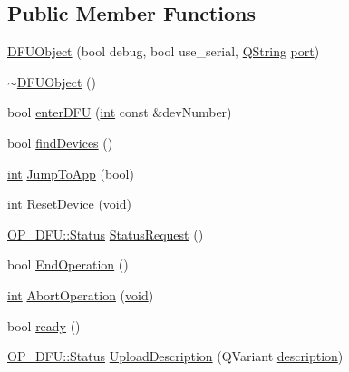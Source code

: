 \subsection*{Public Member Functions}
\begin{DoxyCompactItemize}
\item 
\hyperlink{group___uploader_gacb8ee3e1b1358ae25813e37f08b6d510}{D\-F\-U\-Object} (bool debug, bool use\-\_\-serial, \hyperlink{group___u_a_v_objects_plugin_gab9d252f49c333c94a72f97ce3105a32d}{Q\-String} \hyperlink{classport}{port})
\item 
\hyperlink{group___uploader_gad3eb7cce298c72c456a84eb04cc9c0fe}{$\sim$\-D\-F\-U\-Object} ()
\item 
bool \hyperlink{group___uploader_ga64ed24565b35c4530dd2614cc98f38cd}{enter\-D\-F\-U} (\hyperlink{ioapi_8h_a787fa3cf048117ba7123753c1e74fcd6}{int} const \&dev\-Number)
\item 
bool \hyperlink{group___uploader_ga09f55b9de769e32ad728223294a8a500}{find\-Devices} ()
\item 
\hyperlink{ioapi_8h_a787fa3cf048117ba7123753c1e74fcd6}{int} \hyperlink{group___uploader_gad6165621f503c5767306199a8606edaf}{Jump\-To\-App} (bool)
\item 
\hyperlink{ioapi_8h_a787fa3cf048117ba7123753c1e74fcd6}{int} \hyperlink{group___uploader_gafbdc3dede843764690ebd5bc074ff5dd}{Reset\-Device} (\hyperlink{group___u_a_v_objects_plugin_ga444cf2ff3f0ecbe028adce838d373f5c}{void})
\item 
\hyperlink{class_o_p___d_f_u_a83b075feaf572fe76e597acea58c8eda}{O\-P\-\_\-\-D\-F\-U\-::\-Status} \hyperlink{group___uploader_gadd798371bcb5c155ef215f5a77316471}{Status\-Request} ()
\item 
bool \hyperlink{group___uploader_ga16f60a8d921f01aca803178398ccdf45}{End\-Operation} ()
\item 
\hyperlink{ioapi_8h_a787fa3cf048117ba7123753c1e74fcd6}{int} \hyperlink{group___uploader_gaa448917a297dd634c2ab4d760a6c402d}{Abort\-Operation} (\hyperlink{group___u_a_v_objects_plugin_ga444cf2ff3f0ecbe028adce838d373f5c}{void})
\item 
bool \hyperlink{class_o_p___d_f_u_1_1_d_f_u_object_a1c9a40869c444e1c095c99b74a1d5f77}{ready} ()
\item 
\hyperlink{class_o_p___d_f_u_a83b075feaf572fe76e597acea58c8eda}{O\-P\-\_\-\-D\-F\-U\-::\-Status} \hyperlink{group___uploader_ga6513c6ff0fee1f11aebd6312296e6ed6}{Upload\-Description} (Q\-Variant \hyperlink{sdlgamepad_8dox_ae82208d022e4246ddf1e4f481a3f81b0}{description})
\item 

\end{DoxyCompactItemize}
